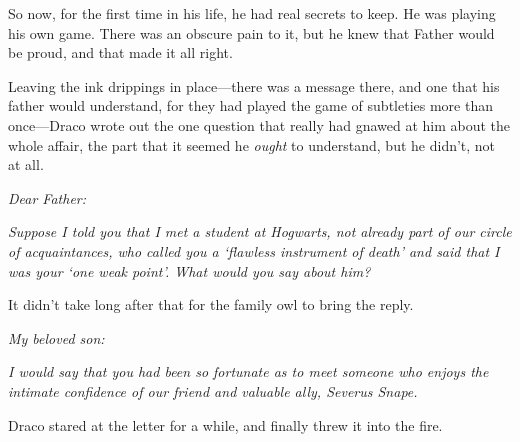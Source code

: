 So now, for the first time in his life, he had real secrets to keep. He was
playing his own game. There was an obscure pain to it, but he knew that Father
would be proud, and that made it all right.

Leaving the ink drippings in place---there was a message there, and one that
his father would understand, for they had played the game of subtleties more
than once---Draco wrote out the one question that really had gnawed at him
about the whole affair, the part that it seemed he \emph{ought} to understand,
but he didn't, not at all.

\emph{Dear Father:}

\emph{Suppose I told you that I met a student at Hogwarts, not already part of
our circle of acquaintances, who called you a `flawless instrument of death'
and said that I was your `one weak point'. What would you say about him?}

It didn't take long after that for the family owl to bring the reply.

\emph{My beloved son:}

\emph{I would say that you had been so fortunate as to meet someone who enjoys
the intimate confidence of our friend and valuable ally, Severus Snape.}

Draco stared at the letter for a while, and finally threw it into the fire.
